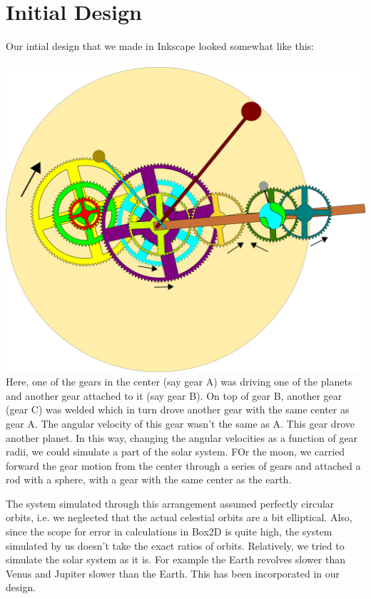 \documentclass[12pt]{report}
\begin{document}
\section*{Initial Design}
Our intial design that we made in Inkscape looked somewhat like this:
\\ \\
\includegraphics[scale=0.1]{./img/svg.png}
\\
Here, one of the gears in the center (say gear A) was driving one of the planets and another gear attached to it (say gear B). On top of gear B, another gear (gear C) was welded which in turn drove another gear with the same center as gear A. The angular velocity of this gear wasn't the same as A. This gear drove another planet. In this way, changing the angular velocities as a function of gear radii, we could simulate a part of the solar system. FOr the moon, we carried forward the gear motion from the center through a series of gears and attached a rod with a sphere, with a gear with the same center as the earth.

The system simulated through this arrangement assumed perfectly circular orbits, i.e. we neglected that the actual celestial orbits are a bit elliptical. Also, since the scope for error in calculations in Box2D is quite high, the system simulated by us doesn't take the exact ratios of orbits. Relatively, we tried to simulate the solar system as it is. For example the Earth revolves slower than Venus and Jupiter slower than the Earth. This has been incorporated in our design.
\end{document}
